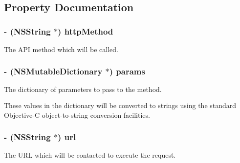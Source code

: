 \subsection{\-Property \-Documentation}
\hypertarget{interface_f_b_request_a950203edc0388db7985ce58fd1373b47}{
\subsubsection[{http\-Method}]{\setlength{\rightskip}{0pt plus 5cm}-\/ ({\bf \-N\-S\-String} $\ast$) http\-Method}}
\label{interface_f_b_request_a950203edc0388db7985ce58fd1373b47}
\-The \-A\-P\-I method which will be called. \hypertarget{interface_f_b_request_aff8df7430c532dd3502e7b39f07c9065}{
\subsubsection[{params}]{\setlength{\rightskip}{0pt plus 5cm}-\/ (\-N\-S\-Mutable\-Dictionary $\ast$) params}}
\label{interface_f_b_request_aff8df7430c532dd3502e7b39f07c9065}
\-The dictionary of parameters to pass to the method.

\-These values in the dictionary will be converted to strings using the standard \-Objective-\/\-C object-\/to-\/string conversion facilities. \hypertarget{interface_f_b_request_a8f68797f342263f201de828425f91279}{
\subsubsection[{url}]{\setlength{\rightskip}{0pt plus 5cm}-\/ ({\bf \-N\-S\-String} $\ast$) url}}
\label{interface_f_b_request_a8f68797f342263f201de828425f91279}
\-The \-U\-R\-L which will be contacted to execute the request. 

